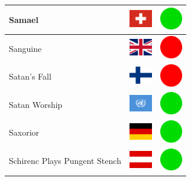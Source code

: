 \documentclass[12pt, a4paper, twoside]{report}
\begin{document}
\begin{center}
\begin{longtable}{|p{5cm}|p{2cm}|p{2cm}|}
Samael & \includegraphics[width=1cm]{4x3/ch} & \includegraphics[width=1cm]{likes/y} \\ \hline
Sanguine & \includegraphics[width=1cm]{4x3/gb} & \includegraphics[width=1cm]{likes/n} \\ \hline
Satan's Fall & \includegraphics[width=1cm]{4x3/fi} & \includegraphics[width=1cm]{likes/n} \\ \hline
Satan Worship & \includegraphics[width=1cm]{4x3/un} & \includegraphics[width=1cm]{likes/y} \\ \hline
Saxorior & \includegraphics[width=1cm]{4x3/de} & \includegraphics[width=1cm]{likes/y} \\ \hline
Schirenc Plays Pungent Stench & \includegraphics[width=1cm]{4x3/at} & \includegraphics[width=1cm]{likes/y} \\ \hline

\end{longtable}
\end{center}
\end{document}

